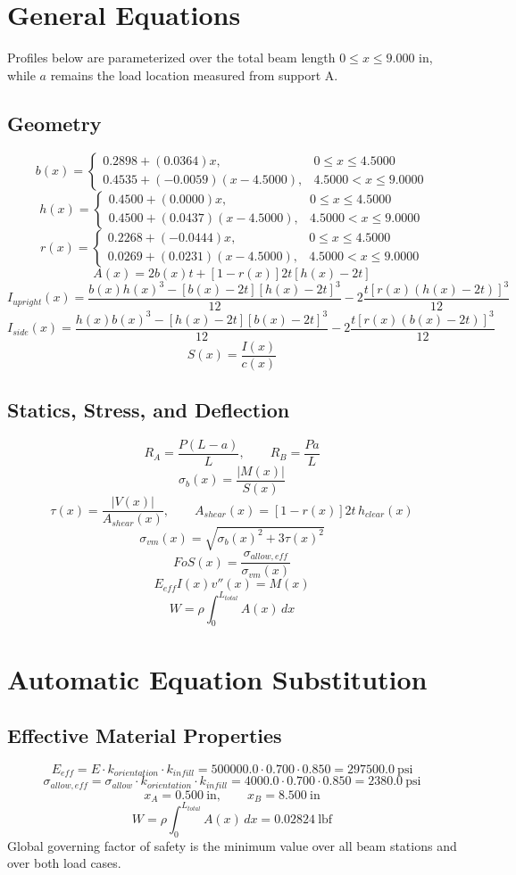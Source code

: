 \documentclass[11pt]{article}
\begin{document}
\section*{General Equations}
Profiles below are parameterized over the total beam length $0 \le x \le 9.000$ in, while $a$ remains the load location measured from support A.
\subsection*{Geometry}
\[
b(x)=\begin{cases}0.2898 + (0.0364)x, & 0 \le x \le 4.5000\\0.4535 + (-0.0059)(x-4.5000), & 4.5000 < x \le 9.0000\end{cases}
\]
\[
h(x)=\begin{cases}0.4500 + (0.0000)x, & 0 \le x \le 4.5000\\0.4500 + (0.0437)(x-4.5000), & 4.5000 < x \le 9.0000\end{cases}
\]
\[
r(x)=\begin{cases}0.2268 + (-0.0444)x, & 0 \le x \le 4.5000\\0.0269 + (0.0231)(x-4.5000), & 4.5000 < x \le 9.0000\end{cases}
\]
\[
A(x)=2b(x)t+[1-r(x)]2t[h(x)-2t]
\]
\[
I_{upright}(x)=\frac{b(x)h(x)^3-[b(x)-2t][h(x)-2t]^3}{12}-2\frac{t[r(x)(h(x)-2t)]^3}{12}
\]
\[
I_{side}(x)=\frac{h(x)b(x)^3-[h(x)-2t][b(x)-2t]^3}{12}-2\frac{t[r(x)(b(x)-2t)]^3}{12}
\]
\[
S(x)=\frac{I(x)}{c(x)}
\]

\subsection*{Statics, Stress, and Deflection}
\[
R_A=\frac{P(L-a)}{L}, \qquad R_B=\frac{Pa}{L}
\]
\[
\sigma_b(x)=\frac{|M(x)|}{S(x)}
\]
\[
\tau(x)=\frac{|V(x)|}{A_{shear}(x)}, \qquad A_{shear}(x)=[1-r(x)]2t\,h_{clear}(x)
\]
\[
\sigma_{vm}(x)=\sqrt{\sigma_b(x)^2+3\tau(x)^2}
\]
\[
FoS(x)=\frac{\sigma_{allow,eff}}{\sigma_{vm}(x)}
\]
\[
E_{eff}I(x)v''(x)=M(x)
\]
\[
W=\rho\int_0^{L_{total}} A(x)\,dx
\]

\section*{Automatic Equation Substitution}
\subsection*{Effective Material Properties}
\[E_{eff} = E \cdot k_{orientation} \cdot k_{infill} = 500000.0 \cdot 0.700 \cdot 0.850 = 297500.0\ \mathrm{psi}\]
\[\sigma_{allow,eff} = \sigma_{allow} \cdot k_{orientation} \cdot k_{infill} = 4000.0 \cdot 0.700 \cdot 0.850 = 2380.0\ \mathrm{psi}\]
\[x_A = 0.500\ \mathrm{in}, \qquad x_B = 8.500\ \mathrm{in}\]
\[W = \rho \int_0^{L_{total}} A(x)\,dx = 0.02824\ \mathrm{lbf}\]
Global governing factor of safety is the minimum value over all beam stations and over both load cases.
\end{document}
